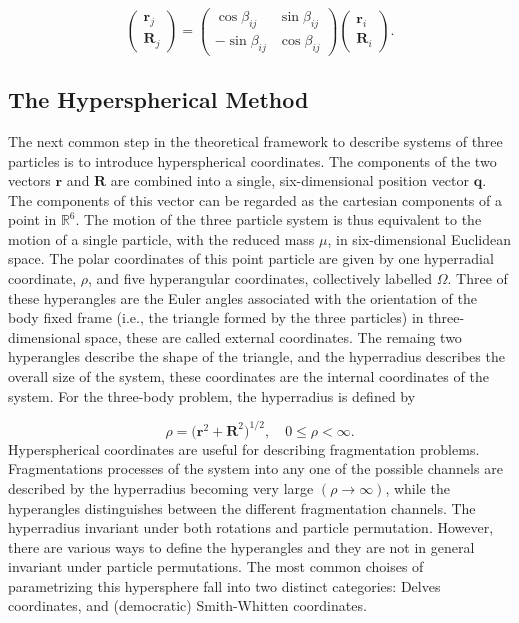 \documentclass{article}
\numberwithin{equation}{section}
\numberwithin{figure}{section}
\begin{document}
\begin{equation}
\begin{pmatrix}
\mathbf{r}_j\\
\mathbf{R}_j
\end{pmatrix}
=
\begin{pmatrix}
\cos\beta_{ij} & \sin\beta_{ij}\\
-\sin\beta_{ij} & \cos\beta_{ij}
\end{pmatrix}
\begin{pmatrix}
\mathbf{r}_i\\
\mathbf{R}_i
\end{pmatrix}.
\end{equation}   


\subsection{The Hyperspherical Method}
The next common step in the theoretical framework to describe systems of three particles is to introduce hyperspherical coordinates. The components of the two vectors $\mathbf{r}$ and $\mathbf{R}$ are combined into a single, six-dimensional position vector $\mathbf{q}$. The components of this vector can be regarded as the cartesian components of a point in $\mathbb{R}^{6}$. The motion of the three particle system is thus equivalent to the motion of a single particle, with the reduced mass $\mu$, in six-dimensional Euclidean space. The polar coordinates of this point particle are given by one hyperradial coordinate, $\rho$, and five hyperangular coordinates, collectively labelled $\Omega$. Three of these hyperangles are the Euler angles associated with the orientation of the body fixed frame (i.e., the triangle formed by the three particles) in three-dimensional space, these are called external coordinates. The remaing two hyperangles describe the shape of the triangle, and the hyperradius describes the overall size of the system, these coordinates are the internal coordinates of the system. For the three-body problem, the hyperradius is defined by

\begin{equation}
\rho = \Big(\mathbf{r}^{2} + \mathbf{R}^{2}\Big)^{1/2}, \quad 0\leq \rho < \infty.
\end{equation} 
Hyperspherical coordinates are useful for describing fragmentation problems. Fragmentations processes of the system into any one of the possible channels are described by the hyperradius becoming very large $(\rho \rightarrow \infty)$, while the hyperangles distinguishes between the different fragmentation channels. The hyperradius invariant under both rotations and particle permutation. However, there are various ways to define the hyperangles and they are not in general invariant under particle permutations. The most common choises of parametrizing this hypersphere fall into two distinct categories: Delves coordinates, and (democratic) Smith-Whitten coordinates. 
\end{document}
